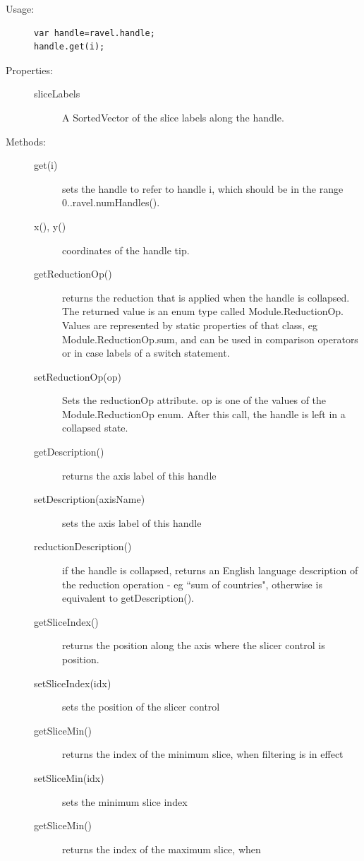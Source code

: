 \documentclass{article}
\begin{document}
\begin{description}
\item[Usage:]\mbox{}
\begin{verbatim}
var handle=ravel.handle;
handle.get(i);
\end{verbatim}

\item[Properties:]\mbox{}
  \begin{description}
  \item[sliceLabels] A SortedVector of the slice labels along the handle.
  \end{description}
  
\item[Methods:]\mbox{}
  \begin{description}
  \item[get(i)] sets the handle to refer to handle i, which should be in
    the range 0..ravel.numHandles().
  \item[x(), y()] coordinates of the handle tip.
  \item[getReductionOp()] returns the reduction that is applied when the
    handle is collapsed. The returned value is an enum type called
    Module.ReductionOp. Values are represented by static properties of
    that class, eg Module.ReductionOp.sum, and can be used in comparison
    operators or in case labels of a switch statement.
  \item[setReductionOp(op)] Sets the reductionOp attribute. op is one of
    the values of the Module.ReductionOp enum. After this call, the
    handle is left in a collapsed state.
  \item[getDescription()] returns the axis label of this handle
  \item[setDescription(axisName)] sets the axis label of this handle
  \item[reductionDescription()] if the handle is collapsed, returns an
English language description of the reduction operation - eg ``sum of
countries", otherwise is equivalent to getDescription().
\item[getSliceIndex()] returns the position along the axis where the
  slicer control is position.
\item[setSliceIndex(idx)] sets the position of the slicer control
\item[getSliceMin()] returns the index of the minimum slice, when
  filtering is in effect
\item[setSliceMin(idx)] sets the minimum slice index
\item[getSliceMin()] returns the index of the maximum slice, when

\end{description}
\end{description}
\end{document}
